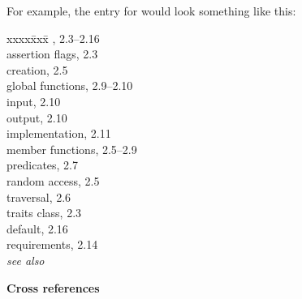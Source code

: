 \documentclass{article}
\newenvironment{indexex}{\begin{tabbing}
xxxx\=xxx\=\kill}{\end{tabbing}}
\begin{document}
\begin{description}
      For example, the entry for  would 
      look something like this:
      \begin{indexex}
          ,       2.3--2.16   \\
          \> assertion flags,                  2.3      \\
          \> creation,                         2.5      \\
          \> global functions,                 2.9--2.10 \\
          \>\> input,                               2.10  \\
          \>\> output,                              2.10  \\
          \> implementation,                   2.11     \\
          \> member functions,                 2.5--2.9 \\
          \>\> predicates,                     2.7      \\
          \>\> random access,                  2.5      \\
          \>\> traversal,                        2.6    \\
          \> traits class,                       2.3  \\
          \>\> default,                          2.16 \\
          \>\> requirements,                     2.14 \\
          \>\> {\em see also}   \\
     \end{indexex}


   \item {\bf Cross references}


\end{description}
\end{document}
